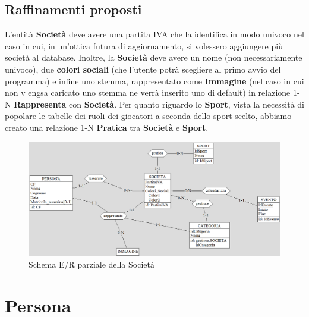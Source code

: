 \documentclass[a4paper,12pt]{report}
\begin{document}
\subsection{Raffinamenti proposti}
L'entità \textbf{Società} deve avere una partita IVA che la identifica in modo univoco nel caso in cui, in un'ottica futura di aggiornamento, si volessero aggiungere più società al database. Inoltre, la \textbf{Società} deve avere un nome (non necessariamente univoco), due \textbf{colori sociali} (che l'utente potrà scegliere al primo avvio del programma) e infine uno stemma, rappresentato come \textbf{Immagine} (nel caso in cui non v engsa caricato uno stemma ne verrà inserito uno di default) in relazione 1-N \textbf{Rappresenta} con \textbf{Società}. \newline \newline
Per quanto riguardo lo \textbf{Sport}, vista la necessità di popolare le tabelle dei ruoli dei giocatori a seconda dello sport scelto, abbiamo creato una relazione 1-N \textbf{Pratica} tra \textbf{Società} e \textbf{Sport}.
\begin{figure}[htp]
    \centering
    \includegraphics[width = \textwidth]{GSS_report/img/societa_raffinamento.png}
    \caption{Schema E/R parziale della Società}
\end{figure}

\newpage
\section{Persona}
\end{document}
